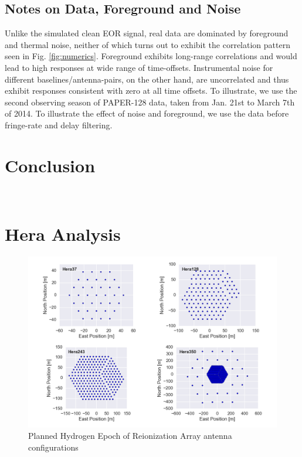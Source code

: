 \documentclass[preprint2,numberedappendix,tighten,twocolappendix]{aastex6}  %
\renewcommand\[{\begin{equation}}
\renewcommand\]{\end{equation}}
\begin{document}
\subsection{Notes on Data, Foreground and Noise}
Unlike the simulated clean EOR signal, real data are dominated by foreground and thermal noise, neither of which turns out to exhibit the correlation pattern seen in Fig.  \ref{fig:numerics}. Foreground exhibits long-range correlations and would lead to high responses at wide range of time-offsets. Instrumental noise for different baselines/antenna-pairs, on the other hand, are uncorrelated and thus exhibit responses consistent with zero at all time offsets. 
To illustrate, we use the second observing season of PAPER-128 data, taken from Jan. 21st to March 7th of 2014. To illustrate the effect of noise and foreground, we use the data before fringe-rate and delay filtering. 

\section{Conclusion}


\appendix
\section{\\Hera Analysis}
\begin{widetext}
\begin{figure}[H]
\includegraphics[scale=0.55]{HeraAntpos}

\caption{Planned Hydrogen Epoch of Reionization Array antenna configurations\label{fig:HeraAntpos}}
\end{figure}
\end{widetext}


\end{document}
